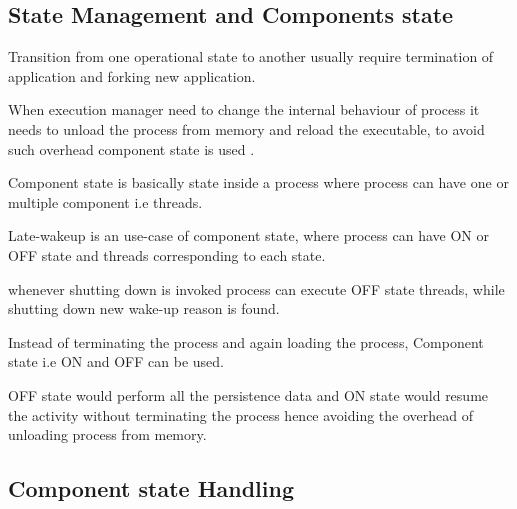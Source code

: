 \subsection*{State Management and Components state}


\begin{DoxyItemize}
\item Transition from one operational state to another usually require termination of application and forking new application.
\item When execution manager need to change the internal behaviour of process it needs to unload the process from memory and reload the executable, to avoid such overhead component state is used .
\item Component state is basically state inside a process where process can have one or multiple component i.\+e threads. 
\item Late-\/wakeup is an use-\/case of component state, where process can have ON or O\+FF state and threads corresponding to each state.
\item whenever shutting down is invoked process can execute O\+FF state threads, while shutting down new wake-\/up reason is found.
\item Instead of terminating the process and again loading the process, Component state i.\+e ON and O\+FF can be used.
\item O\+FF state would perform all the persistence data and ON state would resume the activity without terminating the process hence avoiding the overhead of unloading process from memory.
\end{DoxyItemize}

 \subsection*{Component state Handling}



